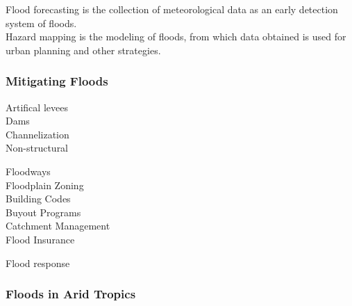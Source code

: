 \documentclass[../../main]{subfiles}
\begin{document}
	Flood forecasting is the collection of meteorological data as an early detection system of floods. \\

	Hazard mapping is the modeling of floods, from which data obtained is used for urban planning and other strategies.

\subsubsection{Mitigating Floods}

	Artifical levees \\

	Dams \\

	Channelization \\

	Non-structural

	\begin{description}
		\item[Floodways]
		\item[Floodplain Zoning]
		\item[Building Codes]
		\item[Buyout Programs]
		\item[Catchment Management]
		\item[Flood Insurance]
	\end{description}

	Flood response

\subsubsection{Floods in Arid Tropics}
\end{document}
